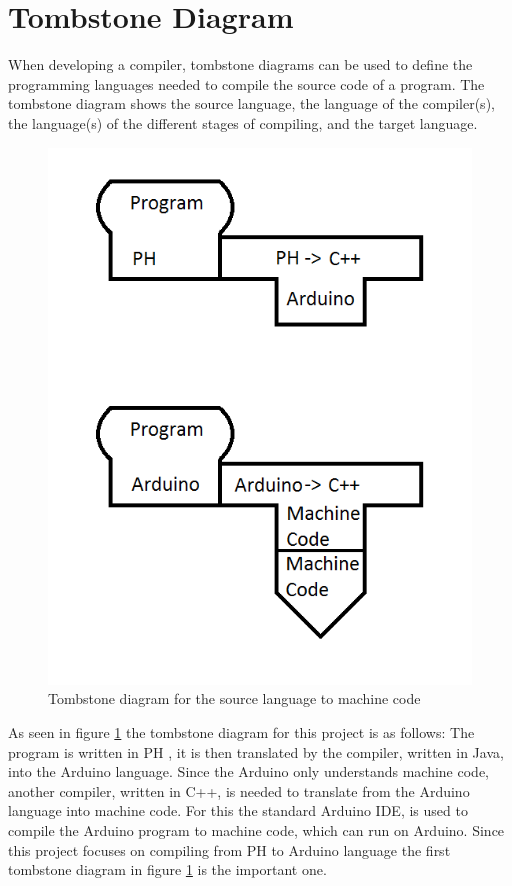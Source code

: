 \section{Tombstone Diagram}
When developing a compiler, tombstone diagrams can be used to define the programming languages needed to compile the source code of a program. The tombstone diagram shows the source language, the language of the compiler(s), the language(s) of the different stages of compiling, and the target language.

\begin{figure}[H]
	\centering
		\includegraphics{billeder/tombstone_diagram.png}
		\caption{Tombstone diagram for the source language to machine code}
		\label{fig:tombstone}
\end{figure}

As seen in figure \ref{fig:tombstone} the tombstone diagram for this project is as follows: The program is written in PH , it is then translated by the compiler, written in Java, into the Arduino language. Since the Arduino only understands machine code, another compiler, written in C++, is needed to translate from the Arduino language into machine code. For this the standard Arduino IDE, is used to compile the Arduino program to machine code, which can run on Arduino.
Since this project focuses on compiling from PH to Arduino language the first tombstone diagram in figure \ref{fig:tombstone} is the important one.